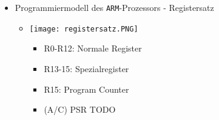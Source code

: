 \begin{itemize}
        \item Programmiermodell des \texttt{ARM}-Prozessors - Registersatz
            \begin{itemize}
                \item[]
                    \begin{minipage}{0.2\textwidth}
                    \texttt{[image: registersatz.PNG]}
                    \end{minipage}
                    \begin{minipage}[t]{0.7\textwidth}
                    \vspace{-2cm}
                        \begin{itemize}
                            \item R0-R12: Normale Register 
                            \item R13-15: Spezialregister
                            \item R15: Program Counter 
                            \item (A/C) PSR TODO
                        \end{itemize}
                    \end{minipage}
            \end{itemize}

        \end{itemize}
        


